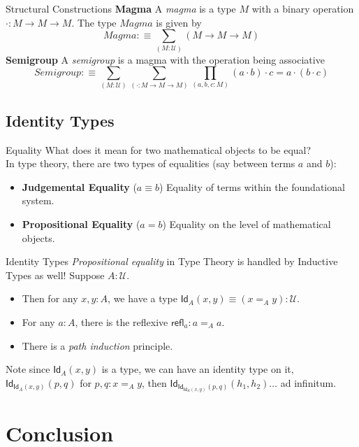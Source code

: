 \documentclass[10pt, aspectratio=169]{beamer}
\newcommand{\U}{\mathcal{U}}
\newcommand{\deq}{\equiv}
\newcommand{\Prod}[2]{\prod_{(#1)}{#2}}
\newcommand{\Sum}[2]{\sum_{(#1)}{#2}}
\newcommand{\0}{\mathbf{0}}
\newcommand{\1}{\mathbf{1}}
\newcommand{\2}{\mathbf{2}}
\newcommand{\Id}{\mathsf{Id}}
\newcommand{\refl}{\mathsf{refl}}
\begin{document}
\begin{frame}{Structural Constructions}
  \textbf{Magma}
  A \emph{magma} is a type $M$ with a binary operation $\cdot : M \to M \to M$. The type $Magma$ is given by
  \[
  Magma :\deq \Sum{M : \U}{\left( M \to M \to M \right)}
  \]
  \textbf{Semigroup}
  A \emph{semigroup} is a magma with the operation being associative
  \[
  Semigroup :\deq \Sum{M : \U}{\Sum{\cdot : M \to M \to M}{\Prod{a, b, c : M}{(a \cdot b) \cdot c = a \cdot (b \cdot c)}}}
  \]
\end{frame}



\subsection{Identity Types}

\begin{frame}{Equality}
  What does it mean for two mathematical objects to be equal? \\
  In type theory, there are two types of equalities (say between terms $a$ and $b$):
  \begin{itemize}
    \item \textbf{Judgemental Equality} ($a \deq b$) Equality of terms within the foundational system.
    \item \textbf{Propositional Equality} ($a = b$) Equality on the level of mathematical objects. 
  \end{itemize}
\end{frame}

\begin{frame}{Identity Types}
  \emph{Propositional equality} in Type Theory is handled by Inductive Types as well!
  Suppose $A : \U$.
  \begin{itemize}
    \item Then for any $x,y : A$, we have a type $\Id_A(x,y) \deq (x =_A y) : \U$.
    \item For any $a : A$, there is the reflexive $\refl_a : a =_A a$.
    \item There is a \emph{path induction} principle.
  \end{itemize}
  Note since $\Id_A(x,y)$ is a type, we can have an identity type on it, $\Id_{\Id_A(x,y)}(p,q)$ for $p, q : x =_A y$,
  then $\Id_{\Id_{\Id_A(x,y)}(p,q)}(h_1, h_2) \ldots $ ad infinitum.
\end{frame}


\section{Conclusion}
\end{document}
